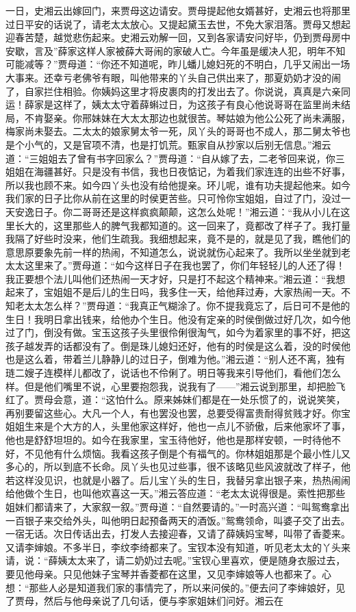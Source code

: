 \begin{parag}
    一日，史湘云出嫁回门，来贾母这边请安。贾母提起他女婿甚好，史湘云也将那里过日平安的话说了，请老太太放心。又提起黛玉去世，不免大家泪落。贾母又想起迎春苦楚，越觉悲伤起来。史湘云劝解一回，又到各家请安问好毕，仍到贾母房中安歇，言及”薛家这样人家被薛大哥闹的家破人亡。今年虽是缓决人犯，明年不知可能减等？”贾母道：“你还不知道呢，昨儿蟠儿媳妇死的不明白，几乎又闹出一场大事来。还幸亏老佛爷有眼，叫他带来的丫头自己供出来了，那夏奶奶才没的闹了，自家拦住相验。你姨妈这里才将皮裹肉的打发出去了。你说说，真真是六亲同运！薛家是这样了，姨太太守着薛蝌过日，为这孩子有良心他说哥哥在监里尚未结局，不肯娶亲。你邢妹妹在大太太那边也就很苦。琴姑娘为他公公死了尚未满服，梅家尚未娶去。二太太的娘家舅太爷一死，凤丫头的哥哥也不成人，那二舅太爷也是个小气的，又是官项不清，也是打饥荒。甄家自从抄家以后别无信息。”湘云道：“三姐姐去了曾有书字回家么？”贾母道：“自从嫁了去，二老爷回来说，你三姐姐在海疆甚好。只是没有书信，我也日夜惦记，为着我们家连连的出些不好事，所以我也顾不来。如今四丫头也没有给他提亲。环儿呢，谁有功夫提起他来。如今我们家的日子比你从前在这里的时侯更苦些。只可怜你宝姐姐，自过了门，没过一天安逸日子。你二哥哥还是这样疯疯颠颠，这怎么处呢！”湘云道：“我从小儿在这里长大的，这里那些人的脾气我都知道的。这一回来了，竟都改了样子了。我打量我隔了好些时没来，他们生疏我。我细想起来，竟不是的，就是见了我，瞧他们的意思原要象先前一样的热闹，不知道怎么，说说就伤心起来了。我所以坐坐就到老太太这里来了。”贾母道：“如今这样日子在我也罢了，你们年轻轻儿的人还了得！我正要想个法儿叫他们还热闹一天才好，只是打不起这个精神来。”湘云道：“我想起来了，宝姐姐不是后儿的生日吗，我多住一天，给他拜过寿，大家热闹一天。不知老太太怎么样？”贾母道：“我真正气糊涂了。你不提我竟忘了，后日可不是他的生日！我明日拿出钱来，给他办个生日。他没有定亲的时侯倒做过好几次，如今他过了门，倒没有做。宝玉这孩子头里很伶俐很淘气，如今为着家里的事不好，把这孩子越发弄的话都没有了。倒是珠儿媳妇还好，他有的时侯是这么着，没的时侯他也是这么着，带着兰儿静静儿的过日子，倒难为他。”湘云道：“别人还不离，独有琏二嫂子连模样儿都改了，说话也不伶俐了。明日等我来引导他们，看他们怎么样。但是他们嘴里不说，心里要抱怨我，说我有了——”湘云说到那里，却把脸飞红了。贾母会意，道：“这怕什么。原来姊妹们都是在一处乐惯了的，说说笑笑，再别要留这些心。大凡一个人，有也罢没也罢，总要受得富贵耐得贫贱才好。你宝姐姐生来是个大方的人，头里他家这样好，他也一点儿不骄傲，后来他家坏了事，他也是舒舒坦坦的。如今在我家里，宝玉待他好，他也是那样安顿，一时待他不好，不见他有什么烦恼。我看这孩子倒是个有福气的。你林姐姐那是个最小性儿又多心的，所以到底不长命。凤丫头也见过些事，很不该略见些风波就改了样子，他若这样没见识，也就是小器了。后儿宝丫头的生日，我替另拿出银子来，热热闹闹给他做个生日，也叫他欢喜这一天。”湘云答应道：“老太太说得很是。索性把那些姐妹们都请来了，大家叙一叙。”贾母道：“自然要请的。”一时高兴道：“叫鸳鸯拿出一百银子来交给外头，叫他明日起预备两天的酒饭。”鸳鸯领命，叫婆子交了出去。一宿无话。次日传话出去，打发人去接迎春，又请了薛姨妈宝琴，叫带了香菱来。又请李婶娘。不多半日，李纹李绮都来了。宝钗本没有知道，听见老太太的丫头来请，说：“薛姨太太来了，请二奶奶过去呢。”宝钗心里喜欢，便是随身衣服过去，要见他母亲。只见他妹子宝琴并香菱都在这里，又见李婶娘等人也都来了。心想：“那些人必是知道我们家的事情完了，所以来问侯的。”便去问了李婶娘好，见了贾母，然后与他母亲说了几句话，便与李家姐妹们问好。湘云在
\end{parag}
